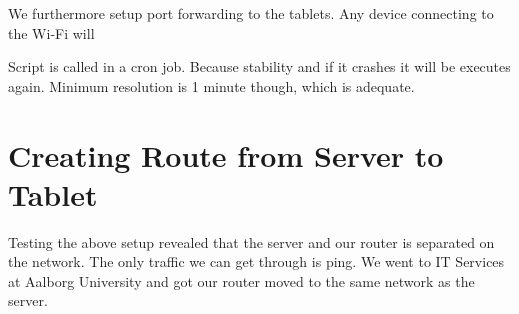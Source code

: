 We furthermore setup port forwarding to the tablets. Any device connecting to the Wi-Fi will 

Script is called in a cron job. Because stability and if it crashes it will be executes again. Minimum resolution is 1 minute though, which is adequate. 

\section{Creating Route from Server to Tablet}
Testing the above setup revealed that the server and our router is separated on the network. The only traffic we can get through is ping. We went to IT Services at Aalborg University and got our router moved to the same network as the server. 